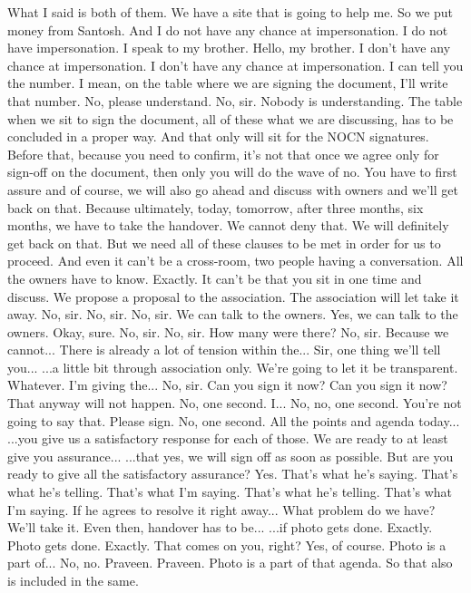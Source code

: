What I said is both of them.
We have a site that is going to help me.
So we put money from Santosh.
And I do not have any chance at impersonation.
I do not have impersonation.
I speak to my brother.
Hello, my brother.
I don't have any chance at impersonation.
I don't have any chance at impersonation.
I can tell you the number.
I mean, on the table where we are signing the document,
I'll write that number.
No, please understand.
No, sir.
Nobody is understanding.
The table when we sit to sign the document,
all of these what we are discussing,
has to be concluded in a proper way.
And that only will sit for the NOCN signatures.
Before that, because you need to confirm,
it's not that once we agree only for sign-off on the document,
then only you will do the wave of no.
You have to first assure and of course,
we will also go ahead and discuss with owners
and we'll get back on that.
Because ultimately, today, tomorrow, after three months,
six months, we have to take the handover.
We cannot deny that.
We will definitely get back on that.
But we need all of these clauses to be met
in order for us to proceed.
And even it can't be a cross-room,
two people having a conversation.
All the owners have to know.
Exactly.
It can't be that you sit in one time and discuss.
We propose a proposal to the association.
The association will let take it away.
No, sir.
No, sir.
No, sir.
We can talk to the owners.
Yes, we can talk to the owners.
Okay, sure.
No, sir.
No, sir.
How many were there?
No, sir.
Because we cannot...
There is already a lot of tension within the...
Sir, one thing we'll tell you...
...a little bit through association only.
We're going to let it be transparent.
Whatever.
I'm giving the...
No, sir.
Can you sign it now?
Can you sign it now?
That anyway will not happen.
No, one second.
I...
No, no, one second.
You're not going to say that.
Please sign.
No, one second.
All the points and agenda today...
...you give us a satisfactory response for each of those.
We are ready to at least give you assurance...
...that yes, we will sign off as soon as possible.
But are you ready to give all the satisfactory assurance?
Yes.
That's what he's saying.
That's what he's telling.
That's what I'm saying.
That's what he's telling.
That's what I'm saying.
If he agrees to resolve it right away...
What problem do we have?
We'll take it.
Even then, handover has to be...
...if photo gets done.
Exactly.
Photo gets done.
Exactly.
That comes on you, right?
Yes, of course.
Photo is a part of...
No, no.
Praveen.
Praveen.
Photo is a part of that agenda.
So that also is included in the same.
